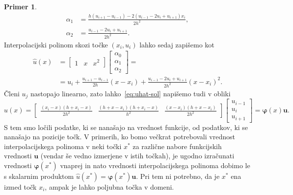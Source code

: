 \documentclass[12pt,a4paper,twoside]{article}
\theoremstyle{definition} %
\newtheorem{primer}[definicija]{Primer}
\theoremstyle{plain} %
\numberwithin{equation}{section}
\renewcommand{\b}{\boldsymbol}
\renewcommand{\phi}{\varphi}
\begin{document}
\begin{primer}
\begin{align}
  \alpha_1 &= \frac{h (u_{i+1}-u_{i-1})-2 (u_{i-1}-2 u_{i}+u_{i+1}) x_i}{2 h^2}, \\
  \alpha_2 &= \frac{u_{i-1}-2 u_{i}+u_{i+1}}{2 h^2}.
\end{align}
Interpolacijski polinom skozi točke $(x_i, u_i)$ lahko sedaj zapišemo kot
\begin{align}
  \hat{u}(x) &=
  \begin{bmatrix}
    1 & x & x^2
  \end{bmatrix}
  \begin{bmatrix}
    \alpha_0 \\ \alpha_1 \\ \alpha_2
  \end{bmatrix} = \nonumber \\
  &= u_i +\frac{u_{i+1}-u_{i-1}}{2 h}(x-x_i)+\frac{u_{i-1}-2 u_{i}+u_{i+1}}{2
  h^2}(x-x_i)^2. \label{eq:uhat-sol}
\end{align}
Členi $u_j$ nastopajo linearno, zato lahko~\eqref{eq:uhat-sol} napišemo tudi v obliki
\begin{equation}
  \hat{u}(x) =
  \begin{bmatrix}
  \frac{(x_i-x) (h+x_i-x)}{2 h^2} & \frac{(h+x-x_i)(h+x_i-x)}{h^2} & \frac{(x-x_i) (h+x-x_i)}{2 h^2}
  \end{bmatrix}
  \begin{bmatrix}
    u_{i-1} \\ u_{i} \\ u_{i+1}
  \end{bmatrix}= \b\phi(x)\b u.
\end{equation}
S tem smo ločili podatke, ki se nanašajo na vrednost funkcije, od podatkov, ki se nanašajo na
pozicije točk. V primerih, ko bomo večkrat potrebovali vrednost interpolacijskega polinoma v neki
točki $x^\ast$ za različne nabore funkcijskih vrednosti $\b u$ (vendar še vedno izmerjene v istih
točkah), je ugodno izračunati vrednosti $\b\phi(x^\ast)$ vnaprej in nato vrednosti
interpolacijskega polinoma dobimo le s skalarnim produktom $\hat u(x^\ast) =
\b\phi(x^\ast) \b u$. Pri tem ni potrebno, da je $x^\ast$ ena izmed točk $x_i$, ampak je lahko
poljubna točka v domeni.


\end{primer}
\end{document}
